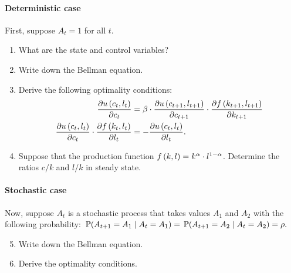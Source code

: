 \documentclass[letterpaper,12pt,leqno]{article}
\begin{document}
\paragraph{Deterministic case} First, suppose $A_{t}=1$ for all $t$.

\begin{enumerate}
\item What are the state and control variables?
\item  Write down the Bellman equation.
\item Derive the following optimality conditions: 
\begin{align*}
\frac{\partial u\left( c_{t},l_{t} \right)}{\partial  c_{t}} &=\beta \cdot \frac{\partial u\left( c_{t+1},l_{t+1} \right)}{\partial c_{t+1}} \cdot \frac{\partial f\left( k_{t+1},l_{t+1} \right)}{\partial  k_{t+1}}\\
\frac{\partial u\left( c_{t},l_{t} \right)}{\partial  c_{t}}\cdot \frac{\partial f\left( k_{t},l_{t} \right)}{\partial l_{t}} &=-\frac{\partial u\left( c_{t},l_{t} \right)}{\partial l_{t}}.
\end{align*}
\item Suppose that the production function $f\left( k,l \right) =k^{\alpha}\cdot l^{1-\alpha}$. Determine the ratios $c/k$ and $l/k$ in steady state.
\end{enumerate}

\paragraph{Stochastic case} Now, suppose $A_{t}$ is a stochastic process that takes values $A_{1}$ and $A_{2}$ with the following probability: $\P{A_{t+1}=A_{1}\mid A_{t}=A_{1}} =\P{A_{t+1}=A_{2}\mid A_{t}=A_{2}} =\rho.$
\begin{enumerate}\setcounter{enumi}{4}
\item Write down the Bellman equation.
\item Derive the optimality conditions.
\end{enumerate}
\end{document}

